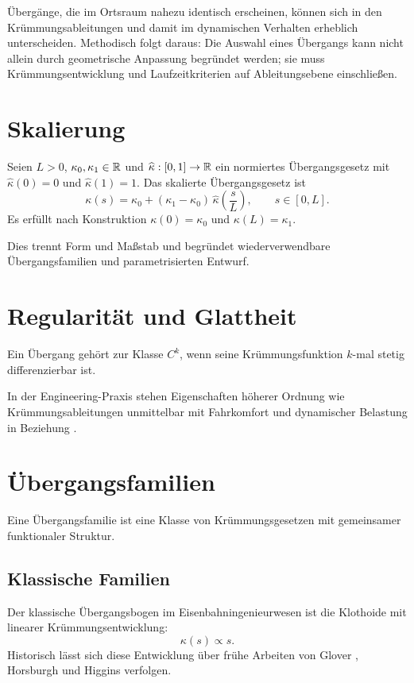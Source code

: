 Übergänge, die im Ortsraum nahezu identisch erscheinen, können sich in den
Krümmungsableitungen und damit im dynamischen Verhalten erheblich
unterscheiden. Methodisch folgt daraus: Die Auswahl eines Übergangs kann nicht
allein durch geometrische Anpassung begründet werden; sie muss
Krümmungsentwicklung und Laufzeitkriterien auf Ableitungsebene einschließen.

\section{Skalierung}
\begin{definition}
\label{def:scaled-transition-law}
Seien \(L>0\), \(\kappa_0,\kappa_1\in\mathbb{R}\) und \(\widehat{\kappa}:[0,1]\to\mathbb{R}\)
ein normiertes Übergangsgesetz mit \(\widehat{\kappa}(0)=0\) und
\(\widehat{\kappa}(1)=1\). Das skalierte Übergangsgesetz ist
\[
\kappa(s)=\kappa_0+(\kappa_1-\kappa_0)\,
\widehat{\kappa}\!\left(\frac{s}{L}\right),
\qquad s\in[0,L].
\]
Es erfüllt nach Konstruktion \(\kappa(0)=\kappa_0\) und
\(\kappa(L)=\kappa_1\).
\end{definition}
Dies trennt Form und Maßstab und begründet wiederverwendbare
Übergangsfamilien und parametrisierten Entwurf.

\section{Regularität und Glattheit}
\begin{definition}[Regularitätsklasse]
Ein Übergang gehört zur Klasse \(C^k\), wenn seine Krümmungsfunktion \(k\)-mal
stetig differenzierbar ist.
\end{definition}
In der Engineering-Praxis stehen Eigenschaften höherer Ordnung wie
Krümmungsableitungen unmittelbar mit Fahrkomfort und dynamischer Belastung in
Beziehung \cite{Mieloszyk2012Transition,Koc2017SmoothedEnds}.

\section{Übergangsfamilien}
\begin{definition}[Übergangsfamilie]
Eine Übergangsfamilie ist eine Klasse von Krümmungsgesetzen mit gemeinsamer
funktionaler Struktur.
\end{definition}

\subsection{Klassische Familien}
Der klassische Übergangsbogen im Eisenbahningenieurwesen ist die Klothoide mit
linearer Krümmungsentwicklung:
\[
\kappa(s)\propto s.
\]
Historisch lässt sich diese Entwicklung über frühe Arbeiten von Glover
\cite{Glover1900TransitionCurves}, Horsburgh
\cite{Horsburgh1913TransitionCurve} und Higgins
\cite{Higgins1922TransitionSpiral} verfolgen.

